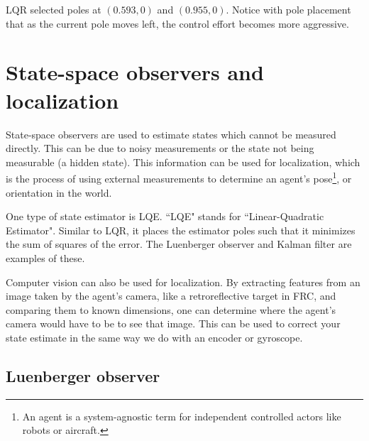 LQR selected poles at $(0.593, 0)$ and $(0.955, 0)$. Notice with pole placement
that as the current pole moves left, the control effort becomes more aggressive.

\section{State-space observers and localization}

State-space observers are used to estimate \glspl{state} which cannot be
measured directly. This can be due to noisy measurements or the state not being
measurable (a hidden state). This information can be used for
\gls{localization}, which is the process of using external measurements to
determine an \gls{agent}'s pose\footnote{An agent is a system-agnostic term for
independent controlled actors like robots or aircraft.}, or orientation in the
world.

One type of state estimator is LQE. ``LQE" stands for ``Linear-Quadratic
Estimator". Similar to LQR, it places the estimator poles such that it minimizes
the sum of squares of the error. The Luenberger observer and Kalman filter are
examples of these.

Computer vision can also be used for \gls{localization}. By extracting features
from an image taken by the \gls{agent}'s camera, like a retroreflective target
in FRC, and comparing them to known dimensions, one can determine where the
\gls{agent}'s camera would have to be to see that image. This can be used to
correct your state estimate in the same way we do with an encoder or gyroscope.

\subsection{Luenberger observer}

